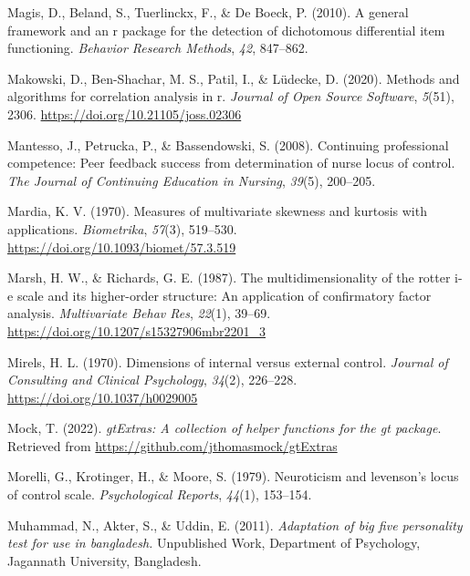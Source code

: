 \documentclass[
  man]{apa6}
\newlength{\cslhangindent}
\newlength{\cslentryspacingunit} %
\newenvironment{CSLReferences}[2] %
 {%
  \setlength{\parindent}{0pt}
  \ifodd #1
  \let\oldpar\par
  \def\par{\hangindent=\cslhangindent\oldpar}
  \fi
  \setlength{\parskip}{#2\cslentryspacingunit}
 }%
 {}
\begin{document}
\begin{CSLReferences}{1}{0}
\leavevmode{}%
Magis, D., Beland, S., Tuerlinckx, F., \& De Boeck, P. (2010). A general framework and an r package for the detection of dichotomous differential item functioning. \emph{Behavior Research Methods}, \emph{42}, 847--862.

\leavevmode{}%
Makowski, D., Ben-Shachar, M. S., Patil, I., \& Lüdecke, D. (2020). Methods and algorithms for correlation analysis in r. \emph{Journal of Open Source Software}, \emph{5}(51), 2306. \url{https://doi.org/10.21105/joss.02306}

\leavevmode{}%
Mantesso, J., Petrucka, P., \& Bassendowski, S. (2008). Continuing professional competence: Peer feedback success from determination of nurse locus of control. \emph{The Journal of Continuing Education in Nursing}, \emph{39}(5), 200--205.

\leavevmode{}%
Mardia, K. V. (1970). Measures of multivariate skewness and kurtosis with applications. \emph{Biometrika}, \emph{57}(3), 519--530. \url{https://doi.org/10.1093/biomet/57.3.519}

\leavevmode{}%
Marsh, H. W., \& Richards, G. E. (1987). The multidimensionality of the rotter i-e scale and its higher-order structure: An application of confirmatory factor analysis. \emph{Multivariate Behav Res}, \emph{22}(1), 39--69. \url{https://doi.org/10.1207/s15327906mbr2201_3}

\leavevmode{}%
Mirels, H. L. (1970). Dimensions of internal versus external control. \emph{Journal of Consulting and Clinical Psychology}, \emph{34}(2), 226--228. \url{https://doi.org/10.1037/h0029005}

\leavevmode{}%
Mock, T. (2022). \emph{gtExtras: A collection of helper functions for the gt package}. Retrieved from \url{https://github.com/jthomasmock/gtExtras}

\leavevmode{}%
Morelli, G., Krotinger, H., \& Moore, S. (1979). Neuroticism and levenson's locus of control scale. \emph{Psychological Reports}, \emph{44}(1), 153--154.

\leavevmode{}%
Muhammad, N., Akter, S., \& Uddin, E. (2011). \emph{Adaptation of big five personality test for use in bangladesh.} Unpublished Work, Department of Psychology, Jagannath University, Bangladesh.


\end{CSLReferences}
\end{document}
